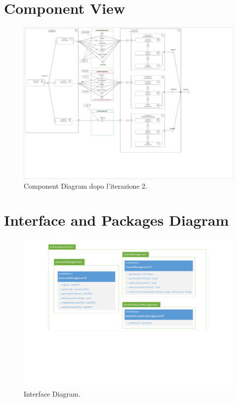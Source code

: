 \section{Component View}

\begin{figure}[h!]
	\centering
	\includegraphics[width=1\linewidth]{./Iterazione 2/OtherFiles/UML - Component View}
	\caption{Component Diagram dopo l'iterazione 2.}
	\label{fig:ComponentDiagram_iterazione2}
\end{figure}
\clearpage

\section{Interface and Packages Diagram}

\begin{figure}[h]
	\centering
	\includegraphics[width=1\linewidth]{./Iterazione 2/OtherFiles/UML - Interface Diagram}
	\caption{Interface Diagram.}
	\label{fig:InterfaceDiagram_iterazione2}
\end{figure}
